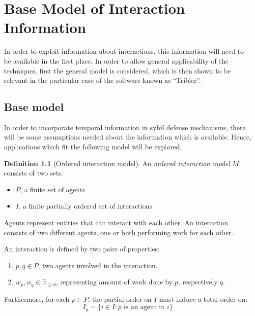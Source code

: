 \documentclass[a4paper,11pt]{book}
\newcommand{\bb}{\mathbb}
\theoremstyle{definition}
\newtheorem{definition}{Definition}
\begin{document}
\chapter{Base Model of Interaction Information}

In order to exploit information about interactions, this information will need to be
available in the first place. In order to allow general applicability of the
techniques, first the general model is considered, which is then shown to be
relevant in the particular case of the software known as ``Tribler''.


\section{Base model}

In order to incorporate temporal information in sybil defense mechanisms,
there will be some assumptions needed about the information which is available.
Hence, applications which fit the following model will be explored.

\begin{definition}[Ordered interaction model]
    An \emph{ordered interaction model} $M$ consists of two sets:  
    
    \begin{itemize}
        \item $P$, a finite set of agents
        \item $I$, a finite partially ordered set of interactions
    \end{itemize}

    Agents represent entities that can interact with each other.
    An interaction consists of two different agents, one or both performing
    work for each other. 
    
    An interaction is defined by two pairs of properties:
    \begin{enumerate}
        \item $p, q \in P$, two agents involved in the interaction.
        \item $w_p, w_q \in \bb{R}_{\geq0}$, representing amount of work done by $p$, respectively $q$.
    \end{enumerate}

    Furthermore, for each $p \in P$, the partial order on $I$ must induce a total order on:
    \begin{equation*}
        I_p = \{i \in I : p \mbox{ is an agent in } i\}
    \end{equation*}
\end{definition}
\end{document}
